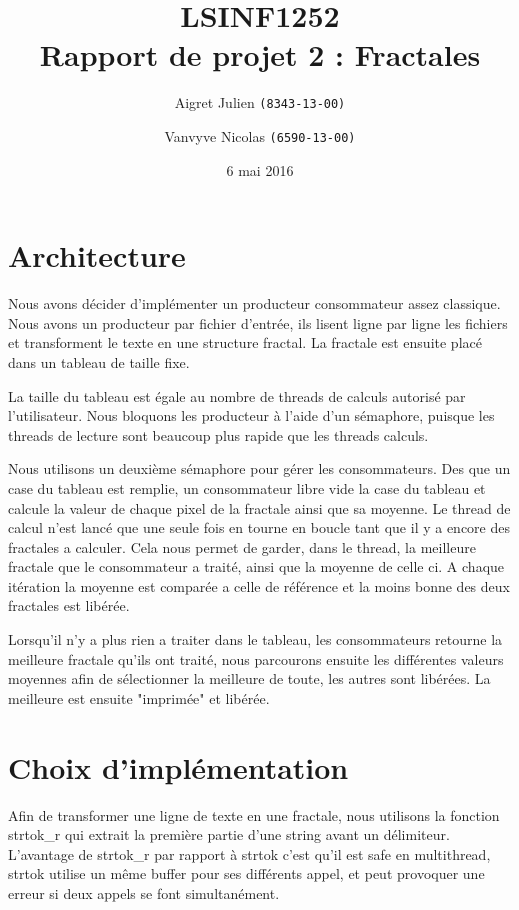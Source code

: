 \documentclass[10pt,a4paper]{article}
\author{Aigret Julien \texttt{(8343-13-00)}\and Vanvyve Nicolas \texttt{(6590-13-00)}}
\date{6 mai 2016}
\title{LSINF1252\\Rapport de projet 2 : Fractales}
\begin{document}
\maketitle


\section{Architecture}

Nous avons décider d'implémenter un producteur consommateur assez classique. Nous avons un producteur par fichier d'entrée, ils lisent ligne par ligne les fichiers et transforment  le texte en une structure fractal. La fractale est ensuite placé dans un tableau de taille fixe.

La taille du tableau est égale au nombre de threads de calculs autorisé par l'utilisateur. Nous bloquons les producteur à l'aide d'un sémaphore, puisque les threads de lecture sont beaucoup plus rapide que les threads calculs.

Nous utilisons un deuxième sémaphore pour gérer les consommateurs. Des que un case du tableau est remplie, un consommateur libre vide la case du tableau et calcule la valeur de chaque pixel de la fractale ainsi que sa moyenne.
Le thread de calcul n'est lancé que une seule fois en tourne en boucle tant que il y a encore des fractales a calculer. Cela nous permet de garder, dans le thread, la meilleure fractale que le consommateur a traité, ainsi que la moyenne de celle ci.
A chaque itération la moyenne est comparée a celle de référence et la moins bonne des deux fractales est libérée.

Lorsqu'il n'y a plus rien a traiter dans le tableau, les consommateurs retourne la meilleure fractale qu'ils ont traité, nous parcourons ensuite les différentes valeurs moyennes afin de sélectionner la meilleure de toute, les autres sont libérées. La meilleure est ensuite "imprimée" et libérée.
 
\section{Choix d'implémentation}

Afin de transformer une ligne de texte en une fractale, nous utilisons la fonction strtok\_r qui extrait la première partie d'une string avant un délimiteur. 
L'avantage de strtok\_r par rapport à strtok c'est qu'il est safe en multithread, strtok utilise un même buffer pour ses différents appel, et peut provoquer une erreur si deux appels se font simultanément.
\end{document}
